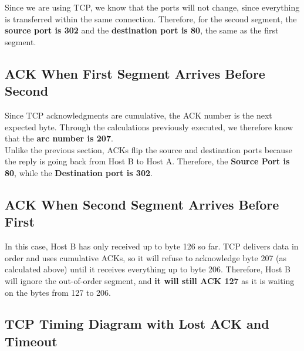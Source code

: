 \documentclass[colorlinks=true, allcolors=blue]{article}
\begin{document}
Since we are using TCP, we know that the ports will not change, since everything is transferred within the same connection. Therefore, for the second segment, the \textbf{source port is 302} and the \textbf{destination port is 80}, the same as the first segment.
\subsection{ACK When First Segment Arrives Before Second}
Since TCP acknowledgments are cumulative, the ACK number is the next expected byte. Through the calculations previously executed, we therefore know that the \textbf{ arc number is 207}. \\

Unlike the previous section, ACKs flip the source and destination ports because the reply is going back from Host B to Host A. Therefore, the \textbf{Source Port is 80}, while the \textbf{Destination port is 302}.
\subsection{ACK When Second Segment Arrives Before First}
In this case, Host B has only received up to byte 126 so far. TCP delivers data in order and uses cumulative ACKs, so it will refuse to acknowledge byte 207 (as calculated above) until it receives everything up to byte 206. Therefore, Host B will ignore the out-of-order segment, and \textbf{it will still ACK 127} as it is waiting on the bytes from 127 to 206.
\subsection{TCP Timing Diagram with Lost ACK and Timeout}
\end{document}
